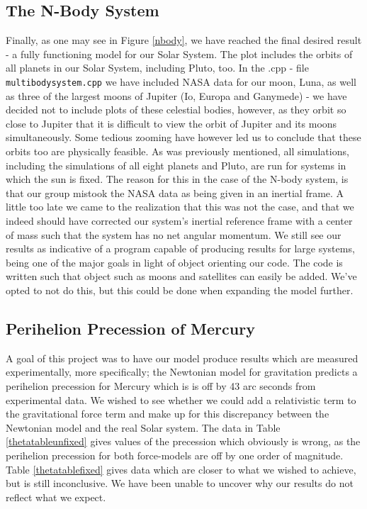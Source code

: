 \subsection{The N-Body System}
Finally, as one may see in Figure \ref{nbody}, we have reached the final desired result - a fully functioning model for our Solar System. The plot includes the orbits of all planets in our Solar System, including Pluto, too. In the .cpp - file \texttt{multibodysystem.cpp} we have included NASA data for our moon, Luna, as well as three of the largest moons of Jupiter (Io, Europa and Ganymede) - we have decided not to include plots of these celestial bodies, however, as they orbit so close to Jupiter that it is difficult to view the orbit of Jupiter and its moons simultaneously. Some tedious zooming have however led us to conclude that these orbits too are physically feasible. As was previously mentioned, all simulations, including the simulations of all eight planets and Pluto, are run for systems in which the sun is fixed. The reason for this in the case of the N-body system, is that our group mistook the NASA data as being given in an inertial frame. A little too late we came to the realization that this was not the case, and that we indeed should have corrected our system's inertial reference frame with a center of mass such that the system has no net angular momentum. We still see our results as indicative of a program capable of producing results for large systems, being one of the major goals in light of object orienting our code. The code is written such that object such as moons and satellites can easily be added. We've opted to not do this, but this could be done when expanding the model further. 

\subsection{Perihelion Precession of Mercury} 
A goal of this project was to have our model produce results which are measured experimentally, more specifically; the Newtonian model for gravitation predicts a perihelion precession for Mercury which is is off by 43 arc seconds from experimental data. We wished to see whether we could add a relativistic term to the gravitational force term and make up for this discrepancy between the Newtonian model and the real Solar system. The data in Table \ref{thetatableunfixed} gives values of the precession which obviously is wrong, as the perihelion precession for both force-models are off by one order of magnitude. Table \ref{thetatablefixed} gives data which are closer to what we wished to achieve, but is still inconclusive. We have been unable to uncover why our results do not reflect what we expect.